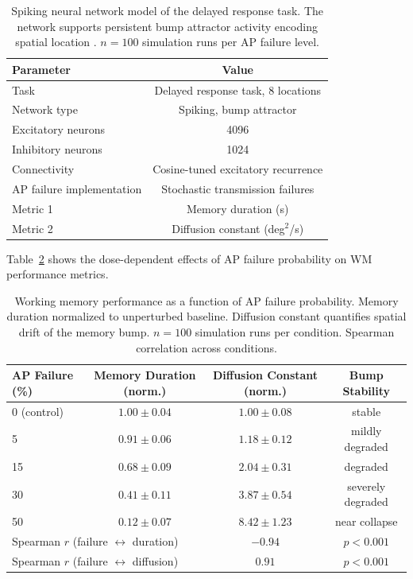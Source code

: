 \documentclass[11pt]{article}
\begin{document}
\begin{table}[H]
\centering
\caption{Spiking neural network model of the delayed response task. The network supports persistent bump attractor activity encoding spatial location \citep{compte2000synaptic, wang2001probabilistic}. $n = 100$ simulation runs per AP failure level.}
\label{tab:network_spec}
\begin{tabular}{lc}
\toprule
\textbf{Parameter} & \textbf{Value} \\
\midrule
Task & Delayed response task, 8 locations \\
Network type & Spiking, bump attractor \\
Excitatory neurons & 4096 \\
Inhibitory neurons & 1024 \\
Connectivity & Cosine-tuned excitatory recurrence \\
AP failure implementation & Stochastic transmission failures \\
Metric 1 & Memory duration (s) \\
Metric 2 & Diffusion constant (deg$^2$/s) \\
\bottomrule
\end{tabular}
\end{table}

Table~\ref{tab:wm_results} shows the dose-dependent effects of AP failure probability on WM performance metrics.

\begin{table}[H]
\centering
\caption{Working memory performance as a function of AP failure probability. Memory duration normalized to unperturbed baseline. Diffusion constant quantifies spatial drift of the memory bump. $n = 100$ simulation runs per condition. Spearman correlation across conditions.}
\label{tab:wm_results}
\begin{tabular}{lccc}
\toprule
\textbf{AP Failure (\%)} & \textbf{Memory Duration (norm.)} & \textbf{Diffusion Constant (norm.)} & \textbf{Bump Stability} \\
\midrule
0 (control) & $1.00 \pm 0.04$ & $1.00 \pm 0.08$ & stable \\
5 & $0.91 \pm 0.06$ & $1.18 \pm 0.12$ & mildly degraded \\
15 & $0.68 \pm 0.09$ & $2.04 \pm 0.31$ & degraded \\
30 & $0.41 \pm 0.11$ & $3.87 \pm 0.54$ & severely degraded \\
50 & $0.12 \pm 0.07$ & $8.42 \pm 1.23$ & near collapse \\
\midrule
\multicolumn{2}{l}{Spearman $r$ (failure $\leftrightarrow$ duration)} & $-0.94$ & $p < 0.001$ \\
\multicolumn{2}{l}{Spearman $r$ (failure $\leftrightarrow$ diffusion)} & $0.91$ & $p < 0.001$ \\
\bottomrule
\end{tabular}
\end{table}
\end{document}
